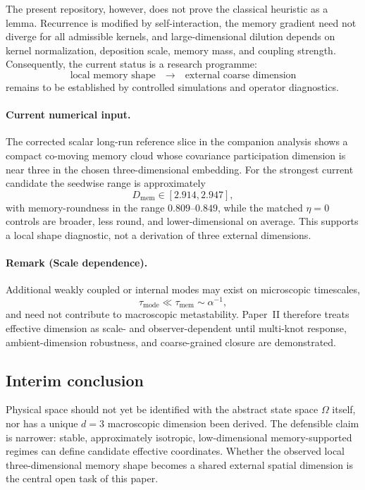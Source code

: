 \documentclass[reprint,amsmath,amssymb,aps,prl,nofootinbib,floatfix]{revtex4-2}
\begin{document}
The present repository, however, does not prove the classical heuristic as a
lemma. Recurrence is modified by self-interaction, the memory gradient need not
diverge for all admissible kernels, and large-dimensional dilution depends on
kernel normalization, deposition scale, memory mass, and coupling strength.
Consequently, the current status is a research programme:
\begin{equation}
\text{local memory shape} \quad\longrightarrow\quad
\text{external coarse dimension}
\end{equation}
remains to be established by controlled simulations and operator diagnostics.

\paragraph{Current numerical input.}
The corrected scalar long-run reference slice in the companion analysis shows
a compact co-moving memory cloud whose covariance participation dimension is
near three in the chosen three-dimensional embedding. For the strongest current
candidate the seedwise range is approximately
\begin{equation}
D_{\mathrm{mem}}\in[2.914,2.947],
\end{equation}
with memory-roundness in the range $0.809$--$0.849$, while the matched
$\eta=0$ controls are broader, less round, and lower-dimensional on average.
This supports a local shape diagnostic, not a derivation of three external
dimensions.

\paragraph{Remark (Scale dependence).}
Additional weakly coupled or internal modes may exist on microscopic
timescales,
\begin{equation}
\tau_{\mathrm{mode}}\ll\tau_{\mathrm{mem}}\sim\alpha^{-1},
\end{equation}
and need not contribute to macroscopic metastability. Paper~II therefore treats
effective dimension as scale- and observer-dependent until multi-knot response,
ambient-dimension robustness, and coarse-grained closure are demonstrated.

\subsection{Interim conclusion}
Physical space should not yet be identified with the abstract state space
$\Omega$ itself, nor has a unique $d=3$ macroscopic dimension been derived.
The defensible claim is narrower: stable, approximately isotropic,
low-dimensional memory-supported regimes can define candidate effective
coordinates. Whether the observed local three-dimensional memory shape becomes
a shared external spatial dimension is the central open task of this paper.
\end{document}
